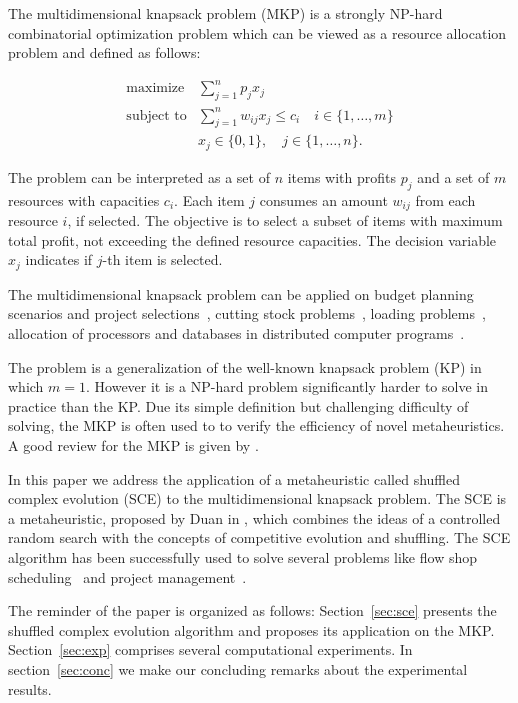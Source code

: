 
The multidimensional knapsack problem (MKP) is a strongly NP-hard combinatorial
optimization problem which can be viewed as a resource allocation problem and
defined as follows:

\begin{align*}
  \text{maximize} & \sum_{j=1}^n p_j x_j \\
  \text{subject to} & \sum_{j=1}^n w_{ij} x_j \leqslant c_i \quad i \in \{1, \ldots, m\}\\
   & x_j \in \{0, 1\}, \quad j \in \{1, \ldots, n\}.
\end{align*}

The problem can be interpreted as a set of $n$ items with profits $p_j$
and a set of $m$ resources with capacities $c_i$.
Each item $j$ consumes an amount $w_{ij}$ from each resource $i$, if selected.
The objective is to select a subset of items with maximum total profit,
not exceeding the defined resource capacities.
The decision variable $x_j$ indicates if $j$-th item is selected.

The multidimensional knapsack problem can be applied on budget planning 
scenarios and project selections~\cite{mcmillan1973resource},
cutting stock problems~\cite{Gilmore-Gomory-1966}, loading problems~\cite{Shih-1979},
allocation of processors and databases in distributed computer programs~\cite{Gavish-Pirckul-1982}.

The problem is a generalization of the well-known knapsack problem (KP) in which
$m = 1$.
However it is a NP-hard problem significantly harder to solve in practice than the KP.
Due its simple definition but challenging difficulty of solving, the MKP is often used to
to verify the efficiency of novel metaheuristics.
A good review for the MKP is given by \cite{freville1994efficient}.

In this paper we address the application of a metaheuristic called
shuffled complex evolution (SCE) to the multidimensional knapsack problem.
The SCE is a metaheuristic, proposed by Duan in \cite{duan1992effective},
which combines the ideas of a controlled random search with the concepts
of competitive evolution and shuffling.
The SCE algorithm has been successfully used to solve several problems
like flow shop scheduling~\cite{zhao2014shuffled} and project management~\cite{elbeltagi2007modified}.

The reminder of the paper is organized as follows:
Section~\ref{sec:sce} presents the shuffled complex evolution algorithm
and proposes its application on the MKP.
Section~\ref{sec:exp} comprises several computational experiments.
In section~\ref{sec:conc} we make our concluding remarks about the experimental
results.


